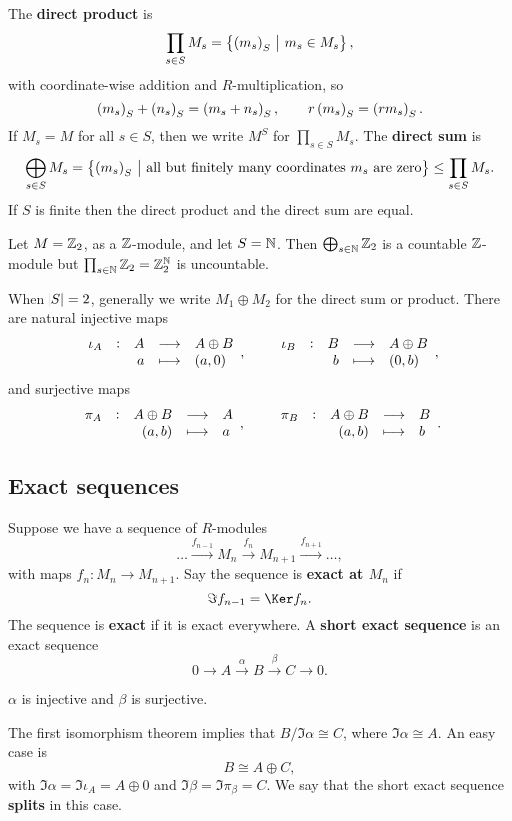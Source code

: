 \begin{definition}
The \textbf{direct product} is
$$ \prod_{s \in S} M_s = \cbr{\br{m_s}_S \st m_s \in M_s}, $$
with coordinate-wise addition and $ R $-multiplication, so
$$ \br{m_s}_S + \br{n_s}_S = \br{m_s + n_s}_S, \qquad r\br{m_s}_S = \br{rm_s}_S. $$
If $ M_s = M $ for all $ s \in S $, then we write $ M^S $ for $ \prod_{s \in S} M_s $. The \textbf{direct sum} is
$$ \bigoplus_{s \in S} M_s = \cbr{\br{m_s}_S \st \text{all but finitely many coordinates} \ m_s \ \text{are zero}} \le \prod_{s \in S} M_s. $$
If $ S $ is finite then the direct product and the direct sum are equal.
\end{definition}

\begin{example*}
Let $ M = \mathbb{Z}_2 $, as a $ \mathbb{Z} $-module, and let $ S = \mathbb{N} $. Then $ \bigoplus_{s \in \mathbb{N}} \mathbb{Z}_2 $ is a countable $ \mathbb{Z} $-module but $ \prod_{s \in \mathbb{N}} \mathbb{Z}_2 = \mathbb{Z}_2^{\mathbb{N}} $ is uncountable.
\end{example*}

When $ \abs{S} = 2 $, generally we write $ M_1 \oplus M_2 $ for the direct sum or product. There are natural injective maps
$$ \function[\iota_A]{A}{A \oplus B}{a}{\br{a, 0}}, \qquad \function[\iota_B]{B}{A \oplus B}{b}{\br{0, b}}, $$
and surjective maps
$$ \function[\pi_A]{A \oplus B}{A}{\br{a, b}}{a}, \qquad \function[\pi_B]{A \oplus B}{B}{\br{a, b}}{b}. $$

\subsection{Exact sequences}

\begin{definition}
Suppose we have a sequence of $ R $-modules
$$ \dots \xrightarrow{f_{n - 1}} M_n \xrightarrow{f_n} M_{n + 1} \xrightarrow{f_{n + 1}} \dots, $$
with maps $ f_n : M_n \to M_{n + 1} $. Say the sequence is \textbf{exact at $ M_n $} if
$$ \Im f_{n - 1} = \Ker f_n. $$
The sequence is \textbf{exact} if it is exact everywhere. A \textbf{short exact sequence} is an exact sequence
$$ 0 \to A \xrightarrow{\alpha} B \xrightarrow{\beta} C \to 0. $$
\end{definition}

\begin{note*}
$ \alpha $ is injective and $ \beta $ is surjective.
\end{note*}

\pagebreak

The first isomorphism theorem implies that $ B / \Im \alpha \cong C $, where $ \Im \alpha \cong A $. An easy case is
$$ B \cong A \oplus C, $$
with $ \Im \alpha = \Im \iota_A = A \oplus 0 $ and $ \Im \beta = \Im \pi_\beta = C $. We say that the short exact sequence \textbf{splits} in this case.

